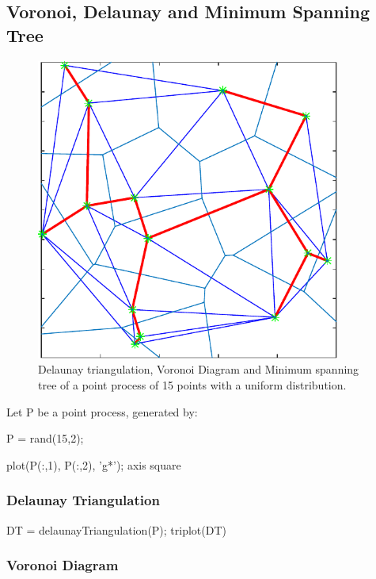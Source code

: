 \def\QRCODE{TB_IPR_TUT.IMG.point_processes_voronoi_matlabqrcode.png}
\def\QRPAGE{http://www.iptutorials.science/tree/master/TB_IPR/TUT.IMG.point_processes_voronoi/matlab}
\subsection{Voronoi, Delaunay and Minimum Spanning Tree}

\begin{figure}[htbp]
 \centering
 \includegraphics[width=10cm]{mst.pdf}
 \caption{Delaunay triangulation, Voronoi Diagram and Minimum spanning tree of a point process of 15 points with a uniform distribution.}
 \label{fig:point_process_voronoi:matlab:mst}
\end{figure}

Let P be a point process, generated by:
\begin{matlab}
P = rand(15,2);

plot(P(:,1), P(:,2), 'g*');
axis square
\end{matlab}

\subsubsection{Delaunay Triangulation}
\begin{matlab}
DT = delaunayTriangulation(P);
triplot(DT)
\end{matlab}

\subsubsection{Voronoi Diagram}

